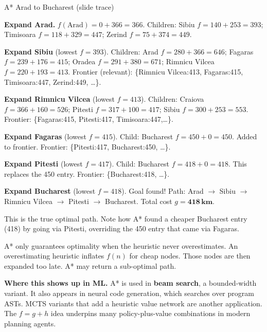 \documentclass[a4paper,11pt]{article}
\begin{document}
\begin{worked}{A* Arad to Bucharest (slide trace)}
\begin{steps}
  \item \textbf{Expand Arad.} $f(\text{Arad})=0+366=366$.
        Children: Sibiu $f=140+253=393$; Timisoara $f=118+329=447$;
        Zerind $f=75+374=449$.
  \item \textbf{Expand Sibiu} (lowest $f=393$).
        Children: Arad $f=280+366=646$; Fagaras $f=239+176=415$;
        Oradea $f=291+380=671$; Rimnicu Vilcea $f=220+193=413$.
        Frontier (relevant): \{Rimnicu Vilcea:413, Fagaras:415,
        Timisoara:447, Zerind:449, \ldots\}.
  \item \textbf{Expand Rimnicu Vilcea} (lowest $f=413$).
        Children: Craiova $f=366+160=526$; Pitesti $f=317+100=417$;
        Sibiu $f=300+253=553$.
        Frontier: \{Fagaras:415, Pitesti:417, Timisoara:447,\ldots\}.
  \item \textbf{Expand Fagaras} (lowest $f=415$).
        Child: Bucharest $f=450+0=450$. Added to frontier.
        Frontier: \{Pitesti:417, Bucharest:450, \ldots\}.
  \item \textbf{Expand Pitesti} (lowest $f=417$).
        Child: Bucharest $f=418+0=418$. This replaces the 450 entry.
        Frontier: \{Bucharest:418, \ldots\}.
  \item \textbf{Expand Bucharest} (lowest $f=418$). Goal found!
        Path: Arad $\to$ Sibiu $\to$ Rimnicu Vilcea $\to$ Pitesti $\to$
        Bucharest. Total cost $g = \mathbf{418\,km}$.
\end{steps}
This is the true optimal path. Note how A* found a cheaper Bucharest entry
(418) by going via Pitesti, overriding the 450 entry that came via Fagaras.
\end{worked}

\begin{watchout}
A* only guarantees optimality when the heuristic never overestimates. An
overestimating heuristic inflates $f(n)$ for cheap nodes. Those nodes are
then expanded too late. A* may return a sub-optimal path.
\end{watchout}

\noindent\textbf{Where this shows up in ML.}
A* is used in \textbf{beam search}, a bounded-width variant. It also appears
in neural code generation, which searches over program ASTs. MCTS variants
that add a heuristic value network are another application. The $f = g+h$
idea underpins many policy-plus-value combinations in modern planning agents.
\end{document}
